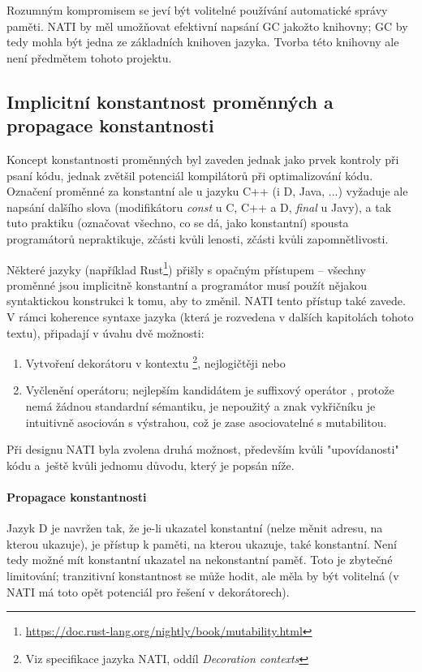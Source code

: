 Rozumným kompromisem se jeví být volitelné používání automatické správy paměti. NATI by měl umožňovat efektivní napsání GC jakožto knihovny; GC by tedy mohla být jedna ze základních knihoven jazyka. Tvorba této knihovny ale není předmětem tohoto projektu.

\subsection{Implicitní konstantnost proměnných a propagace konstantnosti}
Koncept konstantnosti proměnných byl zaveden jednak jako prvek kontroly při psaní kódu, jednak zvětšil potenciál kompilátorů při optimalizování kódu. Označení proměnné za konstantní ale u jazyku C++ (i D, Java, ...) vyžaduje ale napsání dalšího slova (modifikátoru \textit{const} u C, C++ a D, \textit{final} u Javy), a tak tuto praktiku (označovat všechno, co se dá, jako konstantní) spousta programátorů nepraktikuje, zčásti kvůli lenosti, zčásti kvůli zapomnětlivosti.

Některé jazyky (například Rust\footnote{\url{https://doc.rust-lang.org/nightly/book/mutability.html}}) přišly s opačným přístupem -- všechny proměnné jsou implicitně konstantní a programátor musí použít nějakou syntaktickou konstrukci k tomu, aby to změnil. NATI tento přístup také zavede. V rámci koherence syntaxe jazyka (která je rozvedena v dalších kapitolách tohoto textu), připadají v úvahu dvě možnosti:
\begin{enumerate}
	\item Vytvoření dekorátoru v kontextu \footnote{Viz specifikace jazyka NATI, oddíl \textit{Decoration contexts}}, nejlogičtěji  nebo 
	\item Vyčlenění operátoru; nejlepším kandidátem je suffixový operátor , protože nemá žádnou standardní sémantiku, je nepoužitý a znak vykřičníku je intuitivně asociován s výstrahou, což je zase asociovatelné s mutabilitou.
\end{enumerate}

Při designu NATI byla zvolena druhá možnost, především kvůli "upovídanosti" kódu a~ještě kvůli jednomu důvodu, který je popsán níže.

\paragraph{Propagace konstantnosti} Jazyk D je navržen tak, že je-li ukazatel konstantní (nelze měnit adresu, na kterou ukazuje), je přístup k paměti, na kterou ukazuje, také konstantní. Není tedy možné mít konstantní ukazatel na nekonstantní paměť. Toto je zbytečné limitování; tranzitivní konstantnost se může hodit, ale měla by být volitelná (v NATI má toto opět potenciál pro řešení v dekorátorech).

